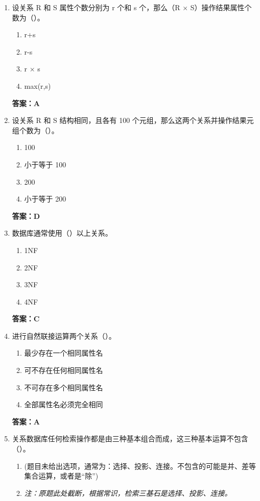 \documentclass[12pt, a4paper]{article}
\begin{document}
\begin{enumerate}[label=\arabic*.]
    \item 设关系 R 和 S 属性个数分别为 r 个和 s 个，那么（R $\times$ S）操作结果属性个数为（\quad）。
    \begin{enumerate}
        \item r+s
        \item r-s
        \item r $\times$ s
        \item max(r,s)
    \end{enumerate}
    \textbf{答案：A}

    \item 设关系 R 和 S 结构相同，且各有 100 个元组，那么这两个关系并操作结果元组个数为（\quad）。
    \begin{enumerate}
        \item 100
        \item 小于等于 100
        \item 200
        \item 小于等于 200
    \end{enumerate}
    \textbf{答案：D}

    \item 数据库通常使用（\quad）以上关系。
    \begin{enumerate}
        \item 1NF
        \item 2NF
        \item 3NF
        \item 4NF
    \end{enumerate}
    \textbf{答案：C}

    \item 进行自然联接运算两个关系（\quad）。
    \begin{enumerate}
        \item 最少存在一个相同属性名
        \item 可不存在任何相同属性名
        \item 不可存在多个相同属性名
        \item 全部属性名必须完全相同
    \end{enumerate}
    \textbf{答案：A}

    \item 关系数据库任何检索操作都是由三种基本组合而成，这三种基本运算不包含（\quad）。
    \begin{enumerate}
        \item (题目未给出选项，通常为：选择、投影、连接。不包含的可能是并、差等集合运算，或者是“除”)
        \item \textit{注：原题此处截断，根据常识，检索三基石是选择、投影、连接。}
    \end{enumerate}
\end{enumerate}
\end{document}
